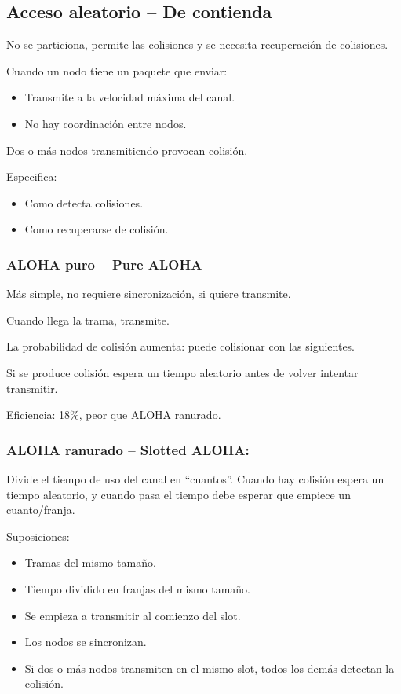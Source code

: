 \documentclass[12pt, twoside, openright]{report} %
\begin{document}
\subsection{Acceso aleatorio -- De contienda}
No se particiona, permite las
colisiones y se necesita recuperación de colisiones.


Cuando un nodo tiene un paquete que enviar:

\begin{itemize}
	\item Transmite a la velocidad máxima del canal.
	\item No hay coordinación entre nodos.
\end{itemize}

Dos o más nodos transmitiendo provocan colisión.

Especifica:

\begin{itemize}
	\item Como detecta colisiones.
	\item Como recuperarse de colisión.
\end{itemize}
\subsubsection{ALOHA puro -- Pure ALOHA}


Más simple, no requiere sincronización, si quiere transmite.

Cuando llega la trama, transmite.

La probabilidad de colisión aumenta: puede colisionar con las
siguientes.

Si se produce colisión espera un tiempo aleatorio antes de
volver intentar transmitir.

Eficiencia: 18\%, peor que ALOHA ranurado.

\subsubsection{ALOHA ranurado -- Slotted ALOHA:}



Divide el tiempo de uso del canal en ``cuantos''. Cuando hay
colisión espera un tiempo aleatorio, y cuando pasa el tiempo
debe esperar que empiece un cuanto/franja.

Suposiciones:

\begin{itemize}
	\item Tramas del mismo tamaño.
	\item Tiempo dividido en franjas del mismo tamaño.
	\item Se empieza a transmitir al comienzo del slot.
	\item Los nodos se sincronizan.
	\item Si dos o más nodos transmiten en el mismo slot, todos los
	      demás detectan la colisión.
\end{itemize}
\end{document}
